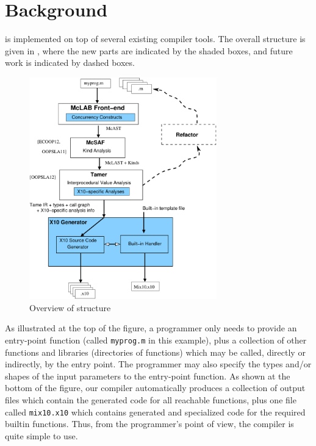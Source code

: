 \section{Background}
\lstset{language=Matlab}

\mixten is implemented on top of several existing \matlab compiler tools.
The overall structure is given in ,  where the new
parts are indicated by the shaded boxes, and future work is indicated by
dashed boxes.     

\begin{figure}[htbp] 
\begin{center}
\includegraphics[width=3.2in]{Figures/overview.pdf} 
\caption {Overview of \mixten structure}\label{Fig:Overview}
\end{center}
\end{figure}

As illustrated at the top of the figure, a \matlab programmer only needs
to provide an entry-point \matlab function (called \texttt{myprog.m} in
this example),  plus a collection of other
\matlab functions and libraries (directories of functions)
which may be called, directly or indirectly, by the entry point.   The
programmer may also specify the types and/or shapes of the input
parameters to the entry-point function.   As shown at the bottom of the
figure, our \mixten compiler automatically produces a collection of
\xten output files which contain the generated \xten code for all
reachable \matlab functions, plus one \xten file called
\texttt{mix10.x10} which contains generated and specialized \xten code
for the required builtin \matlab functions.  Thus, from the \matlab
programmer's point of view,  the \mixten compiler is quite simple to
use.

